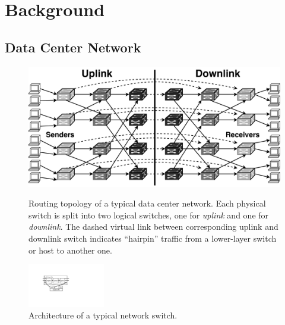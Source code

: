 \section{Background}
\label{sec:background}

\subsection{Data Center Network}
\label{sec:dcn}




\begin{figure}[t]
\centering
{\includegraphics[width=.48\textwidth]{images/dcn_dag.pdf}}
\caption{
	Routing topology of a typical data center network.
	Each physical switch is split into two logical switches, one for \textit{uplink} and one for \textit{downlink}.
    The dashed virtual link between corresponding uplink and downlink switch indicates ``hairpin'' traffic from a lower-layer switch or host to another one.
}
\label{fig:dcn}
\vspace{-1em}
\end{figure}

\begin{figure}[t]
\centering
\includegraphics[width=0.3\textwidth]{images/cropped_switch_architecture.pdf}
\caption{Architecture of a typical network switch.}
\label{fig:switch}
\vspace{-1em}
\end{figure}

